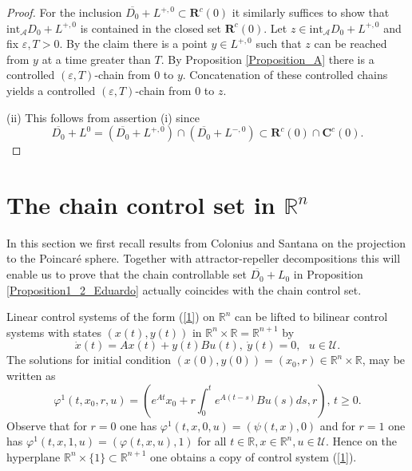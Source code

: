 \documentclass{siamltex}%
\begin{document}
\begin{proof}
For the inclusion $\overline{D_{0}}+L^{+,0}\subset\mathbf{R}^{c}(0)$ it
similarly suffices to show that $\mathrm{int}_{\mathcal{A}}D_{0}+L^{+,0}$ is
contained in the closed set $\mathbf{R}^{c}(0)$. Let $z\in\mathrm{int}%
_{\mathcal{A}}D_{0}+L^{+,0}$ and fix $\varepsilon,T>0$. By the claim there is
a point $y\in L^{+,0}$ such that $z$ can be reached from $y$ at a time greater
than $T$. By Proposition \ref{Proposition_A} there is a controlled
$(\varepsilon,T)$-chain from $0$ to $y$. Concatenation of these controlled
chains yields a controlled $(\varepsilon,T)$-chain from $0$ to $z$.

(ii) This follows from assertion (i) since%
\[
\overline{D_{0}}+L^{0}=(\overline{D_{0}}+L^{+,0})\cap(\overline{D_{0}}%
+L^{-,0})\subset\mathbf{R}^{c}(0)\cap\mathbf{C}^{c}(0).
\]

\end{proof}

\section{The chain control set in $\mathbb{R}^{n}$\label{Section4}}

In this section we first recall results from Colonius and Santana
\cite{ColS23} on the projection to the Poincar\'{e} sphere. Together with
attractor-repeller decompositions this will enable us to prove that the chain
controllable set $\overline{D_{0}}+L_{0}$ in Proposition
\ref{Proposition1_2_Eduardo} actually coincides with the chain control set.

Linear control systems of the form (\ref{1}) on $\mathbb{R}^{n}$ can be lifted
to bilinear control systems with states $(x(t),y(t))$ in $\mathbb{R}^{n}%
\times\mathbb{R}=\mathbb{R}^{n+1}$ by%
\begin{equation}
\dot{x}(t)=Ax(t)+y(t)Bu(t),~\dot{y}(t)=0,\text{ }u\in\mathcal{U}.
\label{lift1}%
\end{equation}
The solutions for initial condition $\left(  x(0),y(0)\right)  =\left(
x_{0},r\right)  \in\mathbb{R}^{n}\times\mathbb{R}$, may be written as
\[
\varphi^{1}(t,x_{0},r,u)=\left(  e^{At}x_{0}+r\int_{0}^{t}e^{A(t-s)}%
Bu(s)ds,r\right)  ,\,t\geq0.
\]
Observe that for $r=0$ one has $\varphi^{1}(t,x,0,u)=\left(  \psi
(t,x),0\right)  $ and for $r=1$ one has $\varphi^{1}(t,x,1,u)=(\varphi
(t,x,u),1)$ for all $t\in\mathbb{R},x\in\mathbb{R}^{n},u\in\mathcal{U}$. Hence
on the hyperplane $\mathbb{R}^{n}\times\{1\}\subset\mathbb{R}^{n+1}$ one
obtains a copy of control system (\ref{1}).
\end{document}
